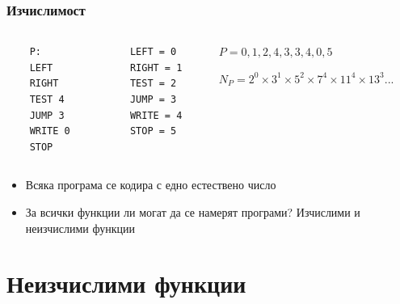 \documentclass{beamer}
\begin{document}
\begin{frame}[fragile]
\frametitle{Изчислимост}





\begin{columns}[t]
  \begin{column}{0.2\textwidth}
    \begin{flushleft}
    \begin{verbatim}
    P:
    LEFT
    RIGHT
    TEST 4
    JUMP 3
    WRITE 0
    STOP
    \end{verbatim}      
    \end{flushleft}
  \end{column}
  \begin{column}{0.2\textwidth}
    \begin{flushleft}
    \begin{verbatim}
    LEFT = 0
    RIGHT = 1
    TEST = 2
    JUMP = 3
    WRITE = 4
    STOP = 5
    \end{verbatim}
      
    \end{flushleft}

  \end{column}

  \begin{column}{0.6\textwidth}
    \begin{flushleft}
    $P = 0, 1, 2, 4, 3, 3, 4, 0, 5$

    $N_P=2^0 \times 3^1 \times 5^2 \times 7^4 \times 11^4 \times 13^ 3 ...$
      
    \end{flushleft}

  \end{column}


\end{columns}


  \begin{itemize}
    \item Всяка програма се кодира с едно естествено число
    \item За всички функции ли могат да се намерят програми? Изчислими и неизчислими функции
  \end{itemize}


\end{frame}

\section{Неизчислими функции}
\end{document}
